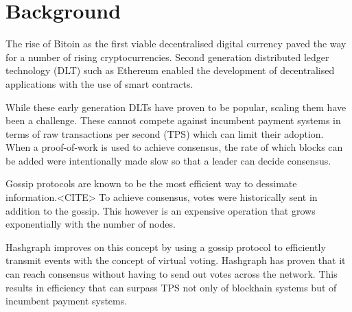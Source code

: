 \section{Background}

The rise of Bitoin as the first viable decentralised digital currency paved the way for a number of rising cryptocurrencies. Second generation distributed ledger technology (DLT) such as Ethereum enabled the development of decentralised applications with the use of smart contracts.

While these early generation DLTs have proven to be popular, scaling them have been a challenge. These cannot compete against incumbent payment systems in terms of raw transactions per second (TPS) which can limit their adoption. When a proof-of-work is used to achieve consensus, the rate of which blocks can be added were intentionally made slow so that a leader can decide consensus.

Gossip protocols are known to be the most efficient way to dessimate information.<CITE> To achieve consensus, votes were historically sent in addition to the gossip. This however is an expensive operation that grows exponentially with the number of nodes.

Hashgraph improves on this concept by using a gossip protocol to efficiently transmit events with the concept of virtual voting. Hashgraph has proven that it can reach consensus without having to send out votes across the network. This results in efficiency that can surpass TPS not only of blockhain systems but of incumbent payment systems.
